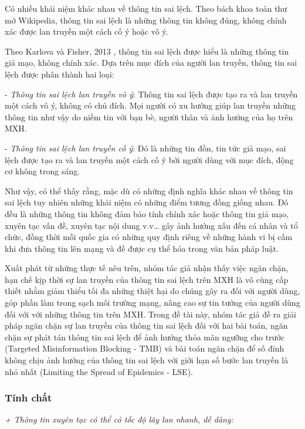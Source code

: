 		Có nhiều khái niệm khác nhau về thông tin sai lệch. Theo bách khoa toàn thư mở Wikipedia, thông tin sai lệch là những thông tin không đúng, không chính xác được lan truyền một cách cố ý hoặc vô ý. 
		
		Theo Karlova và Fisher, 2013 \cite{karlova1}, thông tin sai lệch được hiểu là những thông tin giả mạo, không chính xác. Dựa trên mục đích của người lan truyền, thông tin sai lệch được phân thành hai loại:
		
		- {\itshape Thông tin sai lệch lan truyền vô ý}: Thông tin sai lệch được tạo ra và lan truyền một cách vô ý, không có chủ đích. Mọi người có xu hướng giúp lan truyền những thông tin như vậy do niềm tin với bạn bè, người thân và ảnh hưởng của họ trên MXH.
		
		- {\itshape Thông tin sai lệch lan truyền cố ý}: Đó là những tin đồn, tin tức giả mạo, sai lệch được tạo ra và lan truyền một cách cố ý bởi người dùng với mục đích, động cơ không trong sáng.
		
		Như vậy, có thể thấy rằng, mặc dù có những định nghĩa khác nhau về thông tin sai lệch tuy nhiên những khái niệm có những điểm tương đồng giống nhau. Đó đều là những thông tin không đảm bảo tính chính xác hoặc thông tin giả mạo, xuyên tạc vấn đề, xuyên tạc nội dung v.v… gây ảnh hưởng xấu đến cá nhân và tổ chức, đồng thời mỗi quốc gia có những quy định riêng về những hành vi bị cấm khi đưa thông tin lên mạng và đề được cụ thể hóa trong văn bản pháp luật.
		
		Xuất phát từ những thực tế nêu trên, nhóm tác giả nhận thấy việc ngăn chặn, hạn chế kịp thời sự lan truyền của thông tin sai lệch trên MXH là vô cùng cấp thiết nhằm giảm thiểu tối đa những thiệt hại do chúng gây ra đối với người dùng, góp phần làm trong sạch môi trường mạng, nâng cao sự tin tưởng của người dùng đối với với những thông tin trên MXH. Trong đề tài này, nhóm tác giả đề ra giải pháp ngăn chặn sự lan truyền của thông tin sai lệch đối với hai bài toán, ngăn chặn sự phát tán thông tin sai lệch để ảnh hưởng thỏa mãn ngưỡng cho trước (Targeted Misinformation Blocking - TMB) và bài toán ngăn chặn để số đỉnh không chịu ảnh hưởng của thông tin sai lệch với giới hạn số bước lan truyền là nhỏ nhất (Limiting the Spread of Epidemics - LSE).
		\subsubsection{Tính chất}
		{\itshape + Thông tin xuyên tạc có thể có tốc độ lây lan nhanh, dễ dàng: } 
		
